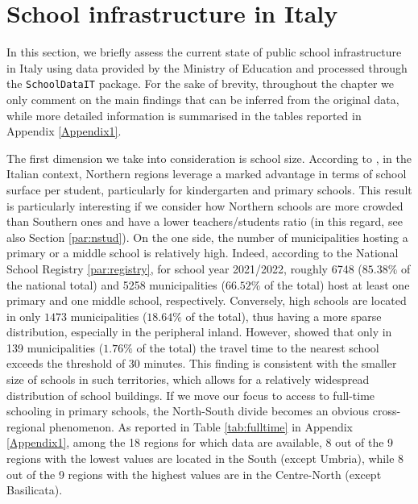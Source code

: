 \documentclass[openany, 11pt, oneside]{book}
\begin{document}
\section{School infrastructure in Italy} \label{section:SchoolDataIT:Overview}


In this section, we briefly assess the current state of public school infrastructure in Italy using data provided by the Ministry of Education and processed through the \texttt{SchoolDataIT} package. For the sake of brevity, throughout the chapter we only comment on the main findings that can be inferred from the original data, while more detailed information is summarised in the tables reported in Appendix \ref{Appendix1}.

The first dimension we take into consideration is school size. According to \cite{BDI}, in the Italian context, Northern regions leverage a marked advantage in terms of school surface per student, particularly for kindergarten and primary schools. This result is particularly interesting if we consider how Northern schools are more crowded than Southern ones and have a lower teachers/students ratio (in this regard, see also Section \ref{par:nstud}). On the one side, the number of municipalities hosting a primary or a middle school is relatively high. Indeed, according to the National School Registry \ref{par:registry}, for school year 2021/2022, roughly 6748 ($85.38\%$ of the national total) and 5258 municipalities ($66.52\%$ of the total) host at least one primary and one middle school, respectively. Conversely, high schools are located in only $1473$ municipalities ($18.64\%$ of the total), thus having a more sparse distribution, especially in the peripheral inland. However, \cite{BDI} showed that only in 139 municipalities ($1.76\%$ of the total) the travel time to the nearest school exceeds the threshold of 30 minutes. This finding is consistent with the smaller size of schools in such territories, which allows for a relatively widespread distribution of school buildings. If we move our focus to access to full-time schooling in primary schools, the North-South divide becomes an obvious cross-regional phenomenon. As reported in Table \ref{tab:fulltime} in Appendix \ref{Appendix1}, among the 18 regions for which data are available, 8 out of the 9 regions with the lowest values are located in the South (except Umbria), while 8 out of the 9 regions with the highest values are in the Centre-North (except Basilicata).
\end{document}
